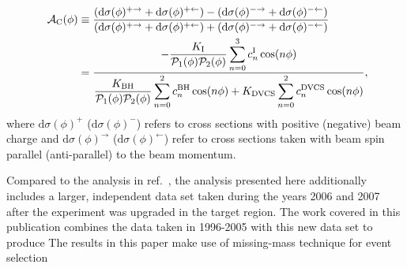 \begin{align}
\hspace{0.5cm}\mathcal{A}_{\textrm{C}}(\phi) &\equiv  
\frac{(\textrm{d}\sigma(\phi)^{+\rightarrow} +
\textrm{d}\sigma(\phi)^{+\leftarrow}) -
(\textrm{d}\sigma(\phi)^{-\rightarrow}
+ \textrm{d}\sigma(\phi)^{-\leftarrow})}{(\textrm{d}\sigma(\phi)^{+\rightarrow}
+
\textrm{d}\sigma(\phi)^{+\leftarrow}) +
(\textrm{d}\sigma(\phi)^{-\rightarrow}
+ \textrm{d}\sigma(\phi)^{-\leftarrow})}&    \nonumber \\
&=\dfrac{{-\dfrac{K_{\textrm{I}}}{\mathcal{P}_{1}(\phi)\mathcal{P}_{2}(\phi)}
\displaystyle\sum_{n=0}^3
c_{n}^{\textrm{I}}\cos(n\phi)}}{\dfrac{K_{\textrm{BH}}}{\mathcal{P}_{1}
(\phi)\mathcal{P}_
{2}(\phi)}
\displaystyle\sum_{n=0}^2
c_{n}^{\textrm{BH}}\cos(n\phi) + 
K_{\textrm{DVCS}}\displaystyle\sum_{n=0}^2 c_{n}^{\textrm{DVCS}}\cos(n\phi)} ,&
\label{e:ac}
\end{align}
where $\textrm{d}\sigma(\phi)^+$ ($\textrm{d}\sigma(\phi)^-$) refers to
cross sections with positive (negative) beam charge and
$\textrm{d}\sigma(\phi)^\rightarrow$ ($\textrm{d}\sigma(\phi)^\leftarrow$) refer
to cross sections taken with beam spin parallel (anti-parallel) to the
beam momentum.

Compared to the analysis in ref.~\cite{Air09}, the analysis presented here additionally includes a larger,
independent data set taken during the years 2006 and 2007 after the
experiment was upgraded in the target region. The work covered
  in this publication combines the data taken in 1996-2005 with this
  new data set to produce 
The results in this paper make use of  missing-mass technique for event selection 
